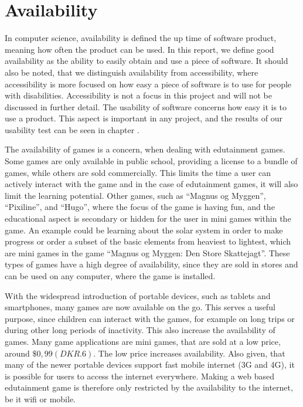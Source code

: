 \section{Availability}
\label{sec:availability}

In computer science, availability is defined the up time of software product, meaning how often the product can be used. \cite{defAvailability} In this report, we define good availability as the ability to easily obtain and use a piece of software. It should also be noted, that we distinguish availability from accessibility, where accessibility is more focused on how easy a piece of software is to use for people with disabilities. Accessibility is not a focus in this project and will not be discussed in further detail.  The usability of software concerns how easy it is to use a product.\cite{defUsability} This aspect is important in any project, and the results of our usability test can be seen in chapter .\newline

The availability of games is a concern, when dealing with edutainment games. Some games are only available in public school, providing a license to a bundle of games, while others are sold commercially. This limits the time a user can actively interact with the game and in the case of edutainment games, it will also limit the learning potential. Other games, such as ``Magnus og Myggen'', ``Pixiline'', and ``Hugo'', where the focus of the game is having fun, and the educational aspect is secondary or hidden for the user in mini games within the game. An example could be learning about the solar system in order to make progress or order a subset of the basic elements from heaviest to lightest, which are mini games in the game ``Magnus og Myggen: Den Store Skattejagt''. These types of games have a high degree of availability, since they are sold in stores and can be used on any computer, where the game is installed.\newline

With the widespread introduction of portable devices, such as tablets and smartphones, many games are now available on the go. This serves a useful purpose, since children can interact with the games, for example on long trips or during other long periods of inactivity. This also increase the availability of games. Many game applications are mini games, that are sold at a low price, around $\$0,99 (DKR. 6)$. The low price increases availability. Also given, that many of the newer portable devices support fast mobile internet (3G and 4G), it is possible for users to access the internet everywhere. Making a web based edutainment game is therefore only restricted by the availability to the internet, be it wifi or mobile.\newline


